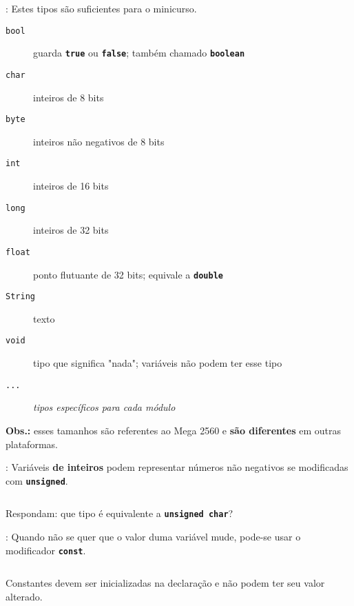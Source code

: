 \begin{frame}{\insertsection: \insertsubsection}
  Estes tipos são suficientes para o minicurso.

  \begin{description}
    \item[\texttt{bool}] guarda \textbf{\texttt{true}} ou \textbf{\texttt{false}}; também chamado \textbf{\texttt{\textcolor{CustomOrange}{boolean}}}
    \item[\texttt{char}] inteiros de 8 bits
    \item[\texttt{byte}] inteiros não negativos de 8 bits
    \item[\texttt{int}] inteiros de 16 bits
    \item[\texttt{long}] inteiros de 32 bits
    \item[\texttt{float}] ponto flutuante de 32 bits; equivale a \textbf{\texttt{\textcolor{CustomOrange}{double}}}
    \item[\texttt{String}] texto
    \item[\texttt{void}] tipo que significa "nada"; variáveis não podem ter esse tipo
    \item[\texttt{...}] \textit{tipos específicos para cada módulo}
  \end{description}

  \vfill
  \textbf{Obs.:} esses tamanhos são referentes ao Mega 2560 e \textbf{são diferentes} em outras plataformas.
\end{frame}


\begin{frame}{\insertsection: \insertsubsection}
  Variáveis \textbf{de inteiros} podem representar números não negativos se modificadas com \textbf{\texttt{\textcolor{CustomOrange}{unsigned}}}.
  \inputminted[firstline=4,lastline=8]{arduino}{sketches/introLinguagem/.variaveis.ino}

  \pause
  Respondam: que tipo é equivalente a \textbf{\texttt{\textcolor{CustomOrange}{unsigned~char}}}?\\
\end{frame}


\begin{frame}{\insertsection: \insertsubsection}
  Quando não se quer que o valor duma variável mude, pode-se usar o modificador \textbf{\texttt{\textcolor{CustomOrange}{const}}}.

  \inputminted[firstline=10,lastline=14]{arduino}{sketches/introLinguagem/.variaveis.ino}

  Constantes devem ser inicializadas na declaração e não podem ter seu valor alterado.
\end{frame}


